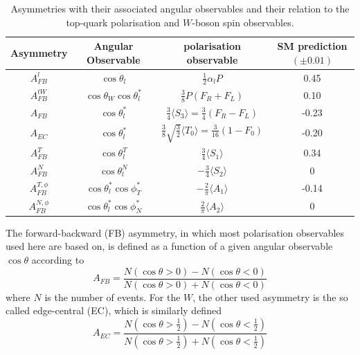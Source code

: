 \begin{table}
\renewcommand{\arraystretch}{1.3}
\begin{tabular}{|c c c c|} 
\hline
Asymmetry & Angular Observable & polarisation observable & SM prediction $(\pm 0.01)$ \\
\hline
$A_{FB}^{l}$ & $\cos \theta_{l}$ & $\frac{1}{2}\alpha_l P$ & 0.45\\

$A_{FB}^{tW}$ & $\cos \theta_{W}\cos \theta_{l}^{*}$ & $\frac{3}{8}P(F_R + F_L)$ & 0.10\\

$A_{FB}$ & $\cos \theta_{l}^{*}$ & $\frac{3}{4}\langle S_3 \rangle=\frac{3}{4}(F_R - F_L)$ & -0.23\\

$A_{EC}$ & $\cos \theta_{l}^{*}$ & $\frac{3}{8} \sqrt{\frac{3}{2}}\langle T_0 \rangle=\frac{3}{16}(1 - F_0)$ & -0.20\\

$A_{FB}^T$ & $\cos \theta_{l}^{T}$ & $\frac{3}{4}\langle S_1 \rangle$ & 0.34\\

$A_{FB}^{N}$ & $\cos \theta_{l}^{N}$ & $-\frac{3}{4}\langle S_2 \rangle$ & 0\\

$A_{FB}^{T,\phi}$ & $\cos \theta_{l}^{*}\cos \phi_{T}^{*}$ & $-\frac{2}{\pi} \langle A_1 \rangle$ & -0.14\\

$A_{FB}^{N,\phi}$ & $\cos \theta_{l}^{*}\cos \phi_{N}^{*}$ & $\frac{2}{\pi} \langle A_2 \rangle$ & 0\\
\hline

\end{tabular}
\caption{Asymmetries with their associated angular observables and their relation to the top-quark polarisation and $W$-boson spin observables.}
\label{table:Asymmetries}
\end{table}

The forward-backward (FB) asymmetry, in which most polarisation observables used here are based on, is defined as a function of a given angular observable $\cos \theta$ according to
\begin{equation}
A_{FB}=\frac{N(\cos\theta > 0)-N(\cos\theta < 0)}{N(\cos\theta > 0)+N(\cos\theta < 0)}
\end{equation}
where $N$ is the number of events. For the $W$, the other used asymmetry is the so called edge-central (EC), which is similarly defined
\begin{equation}
A_{EC}=\frac{N(\cos\theta > \frac{1}{2})-N(\cos\theta < \frac{1}{2})}{N(\cos\theta > \frac{1}{2})+N(\cos\theta < \frac{1}{2})}
\end{equation}

